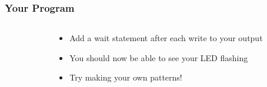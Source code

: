 \begin{frame}
	\frametitle{Your Program}
	\begin{columns}[c]
		\begin{column}{0.6\textwidth}
			
		\end{column}
		\begin{column}{0.4\textwidth}
			\begin{itemize}
				\item Add a wait statement after each write to your output
				\item You should now be able to see your LED flashing
				\item Try making your own patterns!
			\end{itemize}
		\end{column}
	\end{columns}
\end{frame}